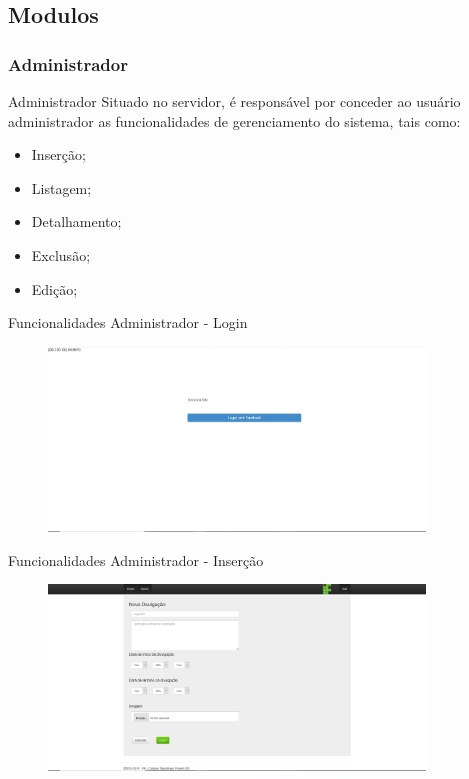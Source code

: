 \documentclass{aula-ifb}
\begin{document}
\subsection{Modulos}
\subsubsection{Administrador}
\begin{frame}{Administrador}
Situado no servidor, é responsável por conceder ao usuário administrador as funcionalidades de gerenciamento do sistema, tais como:
\begin{itemize}
   \item Inserção;
   \item Listagem;
   \item Detalhamento;
   \item Exclusão;
   \item Edição;
\end{itemize}
\end{frame}

\begin{frame}{Funcionalidades Administrador - Login}
\begin{figure}[h]
\includegraphics[width=10cm]{figuras/funcionalidadelogin.png}
\label{fig:facebookgraph}
\end{figure}
\end{frame}

\begin{frame}{Funcionalidades Administrador - Inserção}
\begin{figure}[h]
\includegraphics[width=10cm]{figuras/funcionalidadeinserir.png}
\label{fig:facebookgraph}
\end{figure}
\end{frame}
\end{document}
